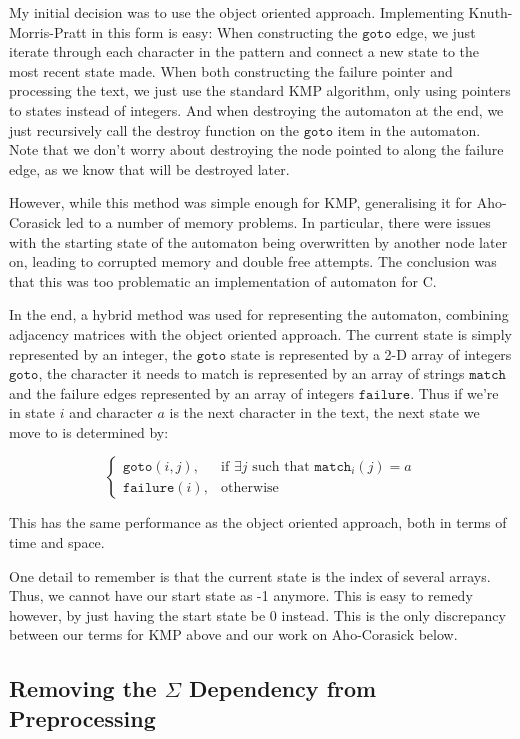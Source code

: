 \documentclass[ %
                    author={Dominic Joseph Moylett},
                    degree={MEng},
                     title={Dictionary Matching with Fingerprints},
                  subtitle={An Empirical Analysis},
                      type={Research},
                      year={2014} ]{dissertation}
\begin{document}
My initial decision was to use the object oriented approach. Implementing Knuth-Morris-Pratt in this form is easy: When constructing the $\texttt{goto}$ edge, we just iterate through each character in the pattern and connect a new state to the most recent state made. When both constructing the failure pointer and processing the text, we just use the standard KMP algorithm, only using pointers to states instead of integers. And when destroying the automaton at the end, we just recursively call the destroy function on the $\texttt{goto}$ item in the automaton. Note that we don't worry about destroying the node pointed to along the failure edge, as we know that will be destroyed later.

However, while this method was simple enough for KMP, generalising it for Aho-Corasick led to a number of memory problems. In particular, there were issues with the starting state of the automaton being overwritten by another node later on, leading to corrupted memory and double free attempts. The conclusion was that this was too problematic an implementation of automaton for C.

In the end, a hybrid method was used for representing the automaton, combining adjacency matrices with the object oriented approach. The current state is simply represented by an integer, the $\texttt{goto}$ state is represented by a 2-D array of integers $\texttt{goto}$, the character it needs to match is represented by an array of strings $\texttt{match}$ and the failure edges represented by an array of integers $\texttt{failure}$. Thus if we're in state $i$ and character $a$ is the next character in the text, the next state we move to is determined by:

\[
  \begin{cases}
    \texttt{goto}(i, j),& \text{if } \exists j \text{ such that } \texttt{match}_i(j) = a\\
    \texttt{failure}(i),& \text{otherwise}
  \end{cases}
\]

This has the same performance as the object oriented approach, both in terms of time and space.

One detail to remember is that the current state is the index of several arrays. Thus, we cannot have our start state as -1 anymore. This is easy to remedy however, by just having the start state be 0 instead. This is the only discrepancy between our terms for KMP above and our work on Aho-Corasick below.

\subsection{Removing the $\Sigma$ Dependency from Preprocessing}
\label{ssec:ac-hashing}
\end{document}
